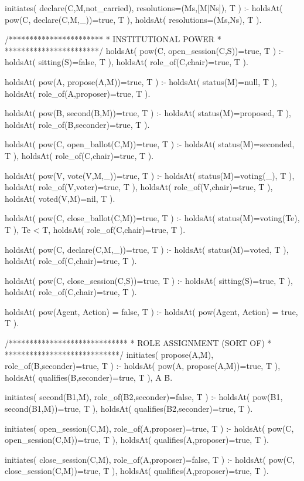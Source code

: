 \begin{prologinline}
initiates( declare(C,M,not_carried), resolutions=(Ms,[M|Ns]), T ) :-
	holdsAt( pow(C, declare(C,M,_))=true, T ),
	holdsAt( resolutions=(Ms,Ns), T ).

/***********************
 * INSTITUTIONAL POWER *
 ***********************/
holdsAt( pow(C, open_session(C,S))=true, T ) :-
	holdsAt( sitting(S)=false, T ),
	holdsAt( role_of(C,chair)=true, T ).

holdsAt( pow(A, propose(A,M))=true, T ) :-
	holdsAt( status(M)=null, T ),
	holdsAt( role_of(A,proposer)=true, T ).

holdsAt( pow(B, second(B,M))=true, T ) :-
	holdsAt( status(M)=proposed, T ),
	holdsAt( role_of(B,seconder)=true, T ).

holdsAt( pow(C, open_ballot(C,M))=true, T ) :-
	holdsAt( status(M)=seconded, T ),
	holdsAt( role_of(C,chair)=true, T ).

holdsAt( pow(V, vote(V,M,_))=true, T ) :-
	holdsAt( status(M)=voting(_), T ),
	holdsAt( role_of(V,voter)=true, T ),
	\+ holdsAt( role_of(V,chair)=true, T ),
	holdsAt( voted(V,M)=nil, T ).

holdsAt( pow(C, close_ballot(C,M))=true, T ) :-
	holdsAt( status(M)=voting(Te), T ), Te < T,
	holdsAt( role_of(C,chair)=true, T ).

holdsAt( pow(C, declare(C,M,_))=true, T ) :-
	holdsAt( status(M)=voted, T ),
	holdsAt( role_of(C,chair)=true, T ).

holdsAt( pow(C, close_session(C,S))=true, T ) :-
	holdsAt( sitting(S)=true, T ),
	holdsAt( role_of(C,chair)=true, T ).

holdsAt( pow(Agent, Action) = false, T ) :-
	\+ holdsAt( pow(Agent, Action) = true, T ).

/*****************************
 * ROLE ASSIGNMENT (SORT OF) *
 ****************************/
initiates( propose(A,M), role_of(B,seconder)=true, T ) :-
	holdsAt( pow(A, propose(A,M))=true, T ),
	holdsAt( qualifies(B,seconder)=true, T ),
	A \= B.

initiates( second(B1,M), role_of(B2,seconder)=false, T ) :-
	holdsAt( pow(B1, second(B1,M))=true, T ),
    holdsAt( qualifies(B2,seconder)=true, T ).

initiates( open_session(C,M), role_of(A,proposer)=true, T ) :-
	holdsAt( pow(C, open_session(C,M))=true, T ),
	holdsAt( qualifies(A,proposer)=true, T ).

initiates( close_session(C,M), role_of(A,proposer)=false, T ) :-
	holdsAt( pow(C, close_session(C,M))=true, T ),
	holdsAt( qualifies(A,proposer)=true, T ).


\end{prologinline}
